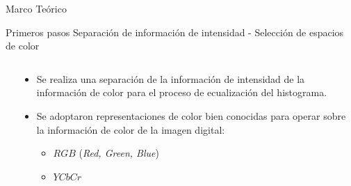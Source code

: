 \documentclass[usenames,dvipsnames]{beamer}
\begin{document}
\begin{frame}{Marco Teórico}
\begin{alertblock}{Primeros pasos}
Separación de información de intensidad - Selección de espacios de color
\end{alertblock}
\begin{columns}[t]
\begin{column}{.3\textwidth}
\end{column}
\begin{column}{.7\textwidth}
\begin{itemize}
	\item Se realiza una separación de la información de intensidad de la información de color para el proceso de ecualización del histograma.
	\item Se adoptaron representaciones de color bien conocidas para operar sobre la información de color de la imagen digital:
	\begin{itemize}
		\item $RGB$ (\textit{Red, Green, Blue})
		\item $YCbCr$
	\end{itemize}
\end{itemize}
\end{column}
\end{columns}
\end{frame}






\end{document}
